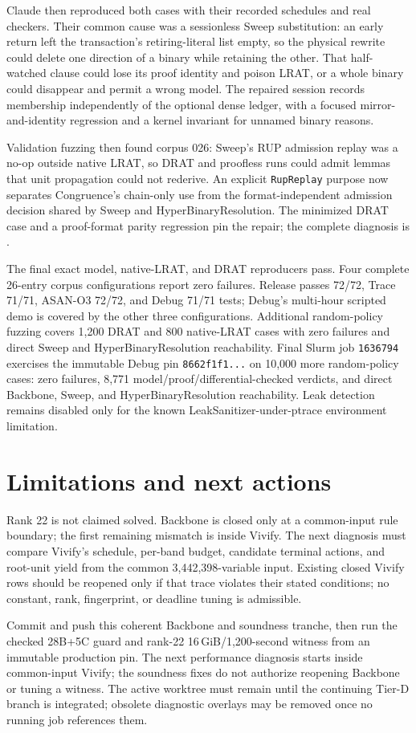 \documentclass[11pt]{article}
\newcommand{\code}[1]{\texttt{#1}}
\newcommand{\artifact}[1]{\path{#1}}
\begin{document}
Claude then reproduced both cases with their recorded schedules and real
checkers.  Their common cause was a sessionless Sweep substitution: an early
return left the transaction's retiring-literal list empty, so the physical
rewrite could delete one direction of a binary while retaining the other.
That half-watched clause could lose its proof identity and poison LRAT, or a
whole binary could disappear and permit a wrong model.  The repaired session
records membership independently of the optional dense ledger, with a focused
mirror-and-identity regression and a kernel invariant for unnamed binary
reasons.

Validation fuzzing then found corpus 026: Sweep's RUP admission replay was a
no-op outside native LRAT, so DRAT and proofless runs could admit lemmas that
unit propagation could not rederive.  An explicit \code{RupReplay} purpose now
separates Congruence's chain-only use from the format-independent admission
decision shared by Sweep and HyperBinaryResolution.  The minimized DRAT case
and a proof-format parity regression pin the repair; the complete diagnosis is
\artifact{benchmarks/reports/2026-08-20-sweep-drat-admission-gate.md}.

The final exact model, native-LRAT, and DRAT reproducers pass.  Four complete
26-entry corpus configurations report zero failures.  Release passes 72/72,
Trace 71/71, ASAN-O3 72/72, and Debug 71/71 tests; Debug's multi-hour scripted
demo is covered by the other three configurations.  Additional random-policy
fuzzing covers 1,200 DRAT and 800 native-LRAT cases with zero failures and
direct Sweep and HyperBinaryResolution reachability.  Final Slurm job
\code{1636794} exercises the immutable Debug pin \code{8662f1f1...} on 10,000
more random-policy cases: zero failures, 8,771 model/proof/differential-checked
verdicts, and direct Backbone, Sweep, and HyperBinaryResolution reachability.
Leak detection remains disabled only for the known LeakSanitizer-under-ptrace
environment limitation.

\section*{Limitations and next actions}
Rank 22 is not claimed solved.  Backbone is closed only at a common-input rule
boundary; the first remaining mismatch is inside Vivify.  The next diagnosis
must compare Vivify's schedule, per-band budget, candidate terminal actions,
and root-unit yield from the common 3,442,398-variable input.  Existing closed
Vivify rows should be reopened only if that trace violates their stated
conditions; no constant, rank, fingerprint, or deadline tuning is admissible.

Commit and push this coherent Backbone and soundness tranche, then run the
checked 28B+5C guard and rank-22
16\,GiB/1,200-second witness from an immutable production pin.  The next
performance diagnosis starts inside common-input Vivify; the soundness fixes
do not authorize reopening Backbone or tuning a witness.  The active worktree
must remain until the continuing Tier-D branch is integrated; obsolete
diagnostic overlays may be removed once no running job references them.
\end{document}
